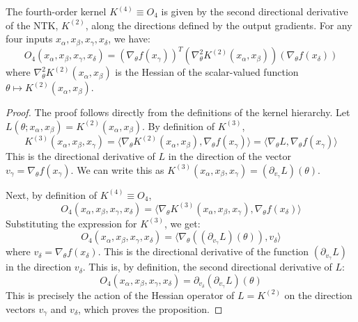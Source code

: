 \documentclass[a4paper]{article}
\begin{document}
\begin{proposition}
The fourth-order kernel $K^{(4)} \equiv O_4$ is given by the second directional derivative of the NTK, $K^{(2)}$, along the directions defined by the output gradients. For any four inputs $x_\alpha, x_\beta, x_\gamma, x_\delta$, we have:
\begin{equation}
O_4(x_\alpha, x_\beta, x_\gamma, x_\delta) = \left( \nabla_\theta f(x_\gamma) \right)^T \left( \nabla^2_\theta K^{(2)}(x_\alpha, x_\beta) \right) \left( \nabla_\theta f(x_\delta) \right)
\end{equation}
where $\nabla^2_\theta K^{(2)}(x_\alpha, x_\beta)$ is the Hessian of the scalar-valued function $\theta \mapsto K^{(2)}(x_\alpha, x_\beta)$.
\end{proposition}

\begin{proof}
The proof follows directly from the definitions of the kernel hierarchy. Let $L(\theta; x_\alpha, x_\beta) = K^{(2)}(x_\alpha, x_\beta)$.
By definition of $K^{(3)}$,
\begin{equation}
K^{(3)}(x_\alpha, x_\beta, x_\gamma) = \langle \nabla_\theta K^{(2)}(x_\alpha, x_\beta), \nabla_\theta f(x_\gamma) \rangle = \langle \nabla_\theta L, \nabla_\theta f(x_\gamma) \rangle
\end{equation}
This is the directional derivative of $L$ in the direction of the vector $v_\gamma = \nabla_\theta f(x_\gamma)$. We can write this as $K^{(3)}(x_\alpha, x_\beta, x_\gamma) = (\partial_{v_\gamma} L)(\theta)$.

Next, by definition of $K^{(4)} \equiv O_4$,
\begin{equation}
O_4(x_\alpha, x_\beta, x_\gamma, x_\delta) = \langle \nabla_\theta K^{(3)}(x_\alpha, x_\beta, x_\gamma), \nabla_\theta f(x_\delta) \rangle
\end{equation}
Substituting the expression for $K^{(3)}$, we get:
\begin{equation}
O_4(x_\alpha, x_\beta, x_\gamma, x_\delta) = \langle \nabla_\theta \left( (\partial_{v_\gamma} L)(\theta) \right), v_\delta \rangle
\end{equation}
where $v_\delta = \nabla_\theta f(x_\delta)$. This is the directional derivative of the function $(\partial_{v_\gamma} L)$ in the direction $v_\delta$. This is, by definition, the second directional derivative of $L$:
\begin{equation}
O_4(x_\alpha, x_\beta, x_\gamma, x_\delta) = \partial_{v_\delta} \left( \partial_{v_\gamma} L \right)(\theta)
\end{equation}
This is precisely the action of the Hessian operator of $L = K^{(2)}$ on the direction vectors $v_\gamma$ and $v_\delta$, which proves the proposition.
\end{proof}
\end{document}
